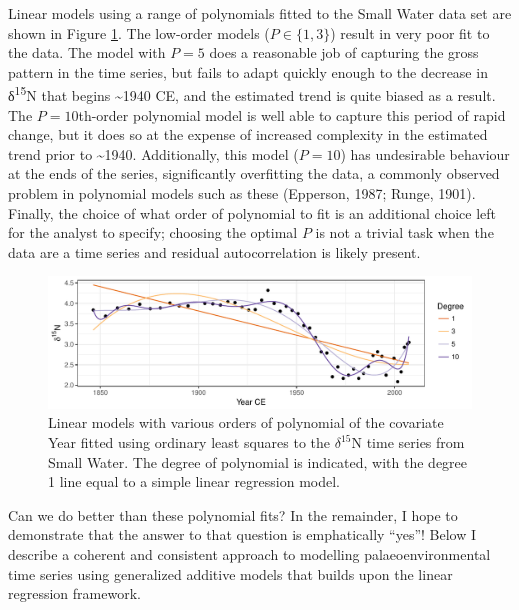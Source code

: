 \documentclass[12pt,]{article}
\begin{document}
Linear models using a range of polynomials fitted to the Small Water
data set are shown in Figure \ref{fig:polynomial-example-plot}. The
low-order models (\(P \in \{1, 3\}\)) result in very poor fit to the
data. The model with \(P = 5\) does a reasonable job of capturing the
gross pattern in the time series, but fails to adapt quickly enough to
the decrease in δ\textsuperscript{15}N that begins \textasciitilde{}1940
CE, and the estimated trend is quite biased as a result. The
\(P = 10\)th-order polynomial model is well able to capture this period
of rapid change, but it does so at the expense of increased complexity
in the estimated trend prior to \textasciitilde{}1940. Additionally,
this model (\(P = 10\)) has undesirable behaviour at the ends of the
series, significantly overfitting the data, a commonly observed problem
in polynomial models such as these (Epperson, 1987; Runge, 1901).
Finally, the choice of what order of polynomial to fit is an additional
choice left for the analyst to specify; choosing the optimal \(P\) is
not a trivial task when the data are a time series and residual
autocorrelation is likely present.

\begin{figure}

{\centering \includegraphics[width=0.8\linewidth]{manuscript_files/figure-latex/polynomial-example-plot-1} 

}

\caption{Linear models with various orders of polynomial of the covariate Year fitted using ordinary least squares to the $\delta^{15}\text{N}$ time series from Small Water. The degree of polynomial is indicated, with the degree 1 line equal to a simple linear regression model.}\label{fig:polynomial-example-plot}
\end{figure}

Can we do better than these polynomial fits? In the remainder, I hope to
demonstrate that the answer to that question is emphatically ``yes''!
Below I describe a coherent and consistent approach to modelling
palaeoenvironmental time series using generalized additive models that
builds upon the linear regression framework.
\end{document}

